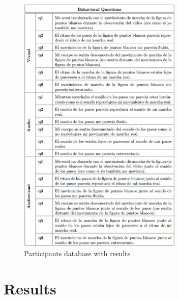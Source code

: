 \begin{figure}[ht]
    \centering
    \includegraphics[width=0.70\textwidth]{appendix/questions.png}
    \caption{Participants database with results}
    \label{fig: Behavioral questions}
\end{figure}

\clearpage
\section*{Results}
